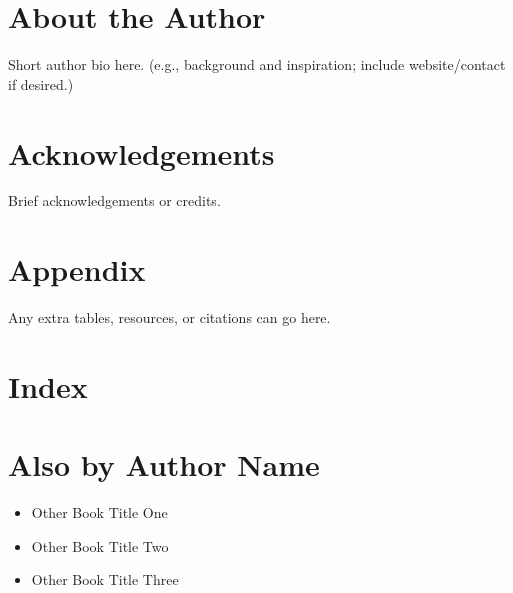 \documentclass[10pt]{book}
\begin{document}
\backmatter

\chapter*{About the Author}
Short author bio here. (e.g., background and inspiration; include website/contact if desired.)

\chapter*{Acknowledgements}
Brief acknowledgements or credits.

\chapter*{Appendix}
Any extra tables, resources, or citations can go here.

\chapter*{Index}

\chapter*{Also by Author Name}
\begin{itemize}
  \item Other Book Title One
  \item Other Book Title Two
  \item Other Book Title Three
\end{itemize}
\end{document}
